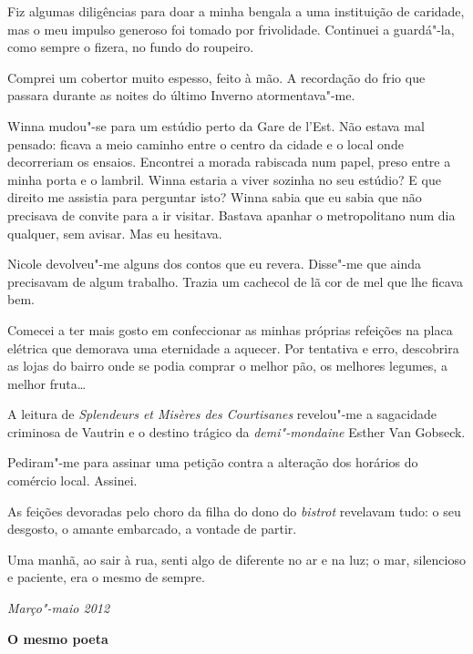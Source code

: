 Fiz algumas diligências para doar a minha bengala a uma instituição de
caridade, mas o meu impulso generoso foi tomado por frivolidade.
Continuei a guardá"-la, como sempre o fizera, no fundo do roupeiro.

Comprei um cobertor muito espesso, feito à mão. A recordação do frio
que passara durante as noites do último Inverno atormentava"-me.

Winna mudou"-se para um estúdio perto da Gare de l'Est. Não estava mal
pensado: ficava a meio caminho entre o centro da cidade e o local onde
decorreriam os ensaios. Encontrei a morada rabiscada num papel, preso
entre a minha porta e
o lambril. Winna estaria a viver sozinha no seu estúdio? E que direito
me assistia para perguntar isto? Winna sabia que eu sabia que não
precisava de convite para a ir visitar. Bastava apanhar o metropolitano
num dia qualquer, sem avisar. Mas eu hesitava.

Nicole devolveu"-me alguns dos contos que eu revera. Disse"-me que ainda
precisavam de algum trabalho. Trazia um cachecol de lã cor de mel que
lhe ficava bem.

Comecei a ter mais gosto em confeccionar as minhas próprias refeições na
placa elétrica que demorava uma eternidade a aquecer. Por tentativa e
erro, descobrira as lojas do bairro onde se podia comprar o melhor pão,
os melhores legumes, a melhor fruta\ldots{}

A leitura de \emph{Splendeurs et Misères des Courtisanes }revelou"-me a sagacidade criminosa de Vautrin e o destino trágico da
\emph{demi"-mondaine }Esther Van Gobseck.

Pediram"-me para assinar uma petição contra a alteração dos horários do
comércio local. Assinei.

As feições devoradas pelo choro da filha do dono do \emph{bistrot
}revelavam tudo: o seu desgosto, o amante embarcado, a vontade de
partir.

Uma manhã, ao sair à rua, senti algo de diferente no ar e na luz; o mar,
silencioso e paciente, era o mesmo de sempre.

\begin{flushright}
\emph{Março"-maio 2012}
\end{flushright}

\movetooddpage\vspace*{1.8cm}
\noindent{}\textbf{O mesmo poeta}
\bigskip

